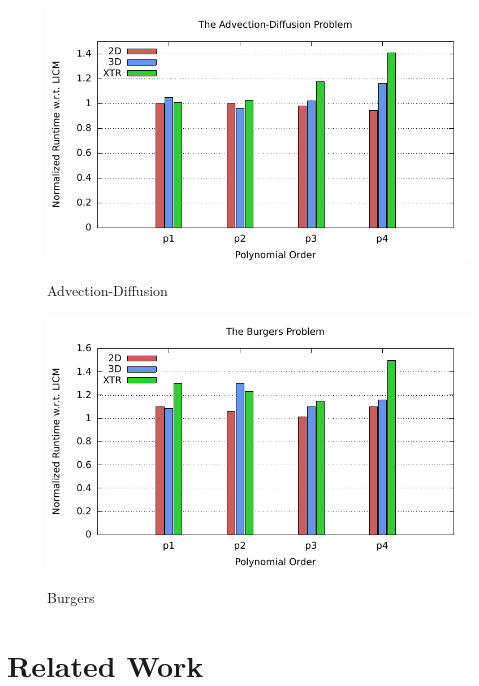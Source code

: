 \documentclass[conference]{IEEEtran}
\begin{document}
\begin{figure}[h]
\centerline{\includegraphics[scale=0.7]{Pictures/advdiff-normalized.pdf}
\label{fig_first_case}}
\caption{Advection-Diffusion}
\end{figure}

\begin{figure}[h]
\centerline{\includegraphics[scale=0.7]{Pictures/burgers-normalized.pdf}
\label{fig_first_case}}
\caption{Burgers}
\end{figure}


\section{Related Work}
\end{document}
